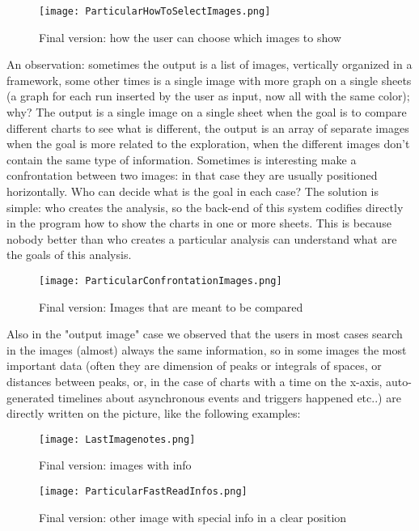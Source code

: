 \begin{figure}[H]
\centering
\texttt{[image: ParticularHowToSelectImages.png]} 
\caption{Final version: how the user can choose which images to show}
\end{figure}


An observation: sometimes the output is a list of images, vertically organized in a framework, some other times is a single image with more graph on a single sheets (a graph for each run inserted by the user as input, now all with the same color); why?
The output is a single image on a single sheet when the goal is to compare different charts to see what is different, the output is an array of separate images when the goal is more related to the exploration, when the different images don't contain the same type of information. Sometimes is interesting make a confrontation between two images: in that case they are usually positioned horizontally. Who can decide what is the goal in each case? The solution is simple: who creates the analysis, so the back-end of this system codifies directly in the program how to show the charts in one or more sheets. This is because nobody better than who creates a particular analysis can understand what are the goals of this analysis.


\begin{figure}[H]
\centering
\texttt{[image: ParticularConfrontationImages.png]} 
\caption{Final version: Images that are meant to be compared}
\end{figure}   


Also in the "output image" case we observed that the users in most cases search in the images (almost) always the same information, so in some images the most important data (often they are dimension of peaks or integrals of spaces, or distances between peaks, or, in the case of charts with a time on the x-axis, auto-generated timelines about asynchronous events and triggers happened etc..) are directly written on the picture, like the following examples:

\begin{figure}[H]
\centering
\texttt{[image: LastImagenotes.png]} 
\caption{Final version: images with info}
\end{figure}   

\begin{figure}[H]
\centering
\texttt{[image: ParticularFastReadInfos.png]} 
\caption{Final version: other image with special info in a clear position }
\end{figure}   

